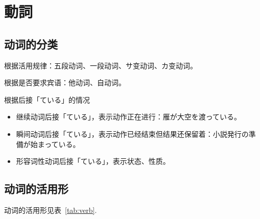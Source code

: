 \section{動詞}%


\subsection{动词的分类}%

\noindent 根据活用规律：五段动词、一段动词、サ变动词、カ变动词。

\noindent 根据是否要求宾语：他动词、自动词。

\noindent 根据后接「ている」的情况
\begin{itemize}
  \item 继续动词后接「ている」，表示动作正在进行：雁が大空を渡っている。
  \item 瞬间动词后接「ている」，表示动作已经结束但结果还保留着：小説発行の準備が始まっている。
  \item 形容词性动词后接「ている」，表示状态、性质。
\end{itemize}



\subsection{动词的活用形}%

动词的活用形见表~\ref{tab:verb}.

